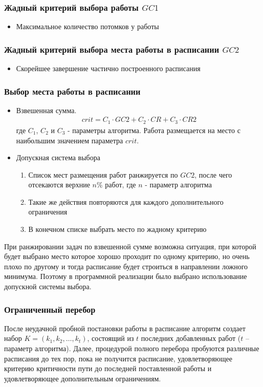 \subsubsection*{Жадный критерий выбора работы $GC1$}
\begin{itemize}
    \item Максимальное количество потомков у работы
\end{itemize}
\subsubsection*{Жадный критерий выбора места работы в расписании $GC2$}
\begin{itemize}
    \item Скорейшее завершение частично построенного расписания
\end{itemize}
\subsubsection*{Выбор места работы в расписании}
\begin{itemize}
    \item Взвешенная сумма.
          \begin{gather*}
              crit = C_1 \cdot GC2 + C_2 \cdot CR + C_3 \cdot CR2
          \end{gather*}
          где $C_1$, $C_2$ и $C_3$ - параметры алгоритма. Работа размещается на место с наибольшим значением параметра $crit$.
    \item Допускная система выбора
          \begin{enumerate}
              \item Список мест размещения работ ранжируется по $GC2$, после чего отсекаются верхние $n\%$ работ, где $n$ - параметр алгоритма
              \item Такие же действия повторяются для каждого дополнительного ограничения
              \item В конечном списке выбрать место по жадному критерию
          \end{enumerate}
\end{itemize}
При ранжировании задач по взвешенной сумме возможна ситуация, при которой будет выбрано место которое хорошо проходит по одному критерию, но очень плохо по другому и тогда расписание будет строиться в направлении ложного минимума. Поэтому в программной реализации было выбрано использование допускной системы выбора.
\subsubsection*{Ограниченный перебор}
После неудачной пробной постановки работы в расписание алгоритм создает набор $K = \left( k_1, k_2, \dots, k_t \right)$, состоящий из $t$ последних добавленных работ ($t$ – параметр алгоритма). Далее, процедурой полного перебора пробуются различные расписания до тех пор, пока не получится расписание, удовлетворяющее критерию критичности пути до последней поставленной работы и удовлетворяющее дополнительным ограничениям.
